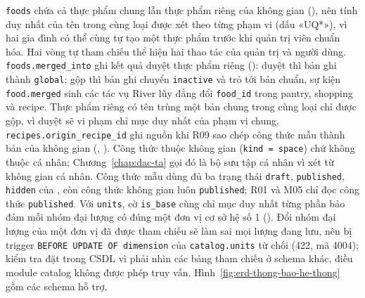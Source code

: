 \texttt{foods} chứa cả thực phẩm chung lẫn thực phẩm riêng của không gian (), nên tính duy nhất của tên trong cùng loại được xét theo từng phạm vi (dấu «UQ*»), vì hai gia đình có thể cùng tự tạo một thực phẩm trước khi quản trị viên chuẩn hóa. Hai vòng tự tham chiếu thể hiện hai thao tác của quản trị và người dùng. \texttt{foods.merged\_into} ghi kết quả duyệt thực phẩm riêng (): duyệt thì bản ghi thành \texttt{global}; gộp thì bản ghi chuyển \texttt{inactive} và trỏ tới bản chuẩn, sự kiện \texttt{food.merged} sinh các tác vụ River lũy đẳng đổi \texttt{food\_id} trong pantry, shopping và recipe. Thực phẩm riêng có tên trùng một bản chung trong cùng loại chỉ được gộp, vì duyệt sẽ vi phạm chỉ mục duy nhất của phạm vi chung. \texttt{recipes.origin\_recipe\_id} ghi nguồn khi R09 sao chép công thức mẫu thành bản của không gian (, ). Công thức thuộc không gian (\texttt{kind = space}) chứ không thuộc cá nhân; Chương~\ref{chap:dac-ta} gọi đó là bộ sưu tập cá nhân vì xét từ không gian cá nhân. Công thức mẫu dùng đủ ba trạng thái \texttt{draft}, \texttt{published}, \texttt{hidden} của , còn công thức không gian luôn \texttt{published}; R01 và M05 chỉ đọc công thức \texttt{published}. Với \texttt{units}, cờ \texttt{is\_base} cùng chỉ mục duy nhất từng phần bảo đảm mỗi nhóm đại lượng có đúng một đơn vị cơ sở hệ số 1 (). Đổi nhóm đại lượng của một đơn vị đã được tham chiếu sẽ làm sai mọi lượng đang lưu, nên bị trigger \texttt{BEFORE UPDATE OF dimension} của \texttt{catalog.units} từ chối (422, mã 4004); kiểm tra đặt trong CSDL vì phải nhìn các bảng tham chiếu ở schema khác, điều module catalog không được phép truy vấn. Hình~\ref{fig:erd-thong-bao-he-thong} gồm các schema hỗ trợ.


